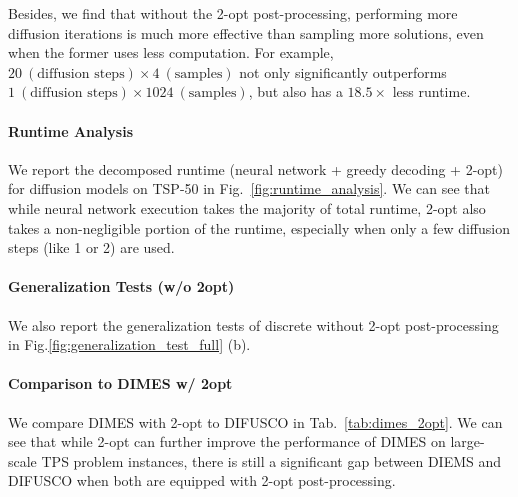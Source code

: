 Besides, we find that without the 2-opt post-processing, performing more diffusion iterations is much more effective than sampling more solutions, even when the former uses less computation. For example, $20\ (\text{diffusion steps}) \times 4 \ (\text{samples})$ not only significantly outperforms $1\ (\text{diffusion steps}) \times 1024\ (\text{samples})$, but also has a $18.5\times$ less runtime.

\paragraph{Runtime Analysis}
We report the decomposed runtime (neural network + greedy decoding + 2-opt) for diffusion models on TSP-50 in Fig.~\ref{fig:runtime_analysis}. We can see that while neural network execution takes the majority of total runtime, 2-opt also takes a non-negligible portion of the runtime, especially when only a few diffusion steps (like 1 or 2) are used.

\paragraph{Generalization Tests (w/o 2opt)}
We also report the generalization tests of discrete \method{} without 2-opt post-processing in Fig.\ref{fig:generalization_test_full} (b).

\paragraph{Comparison to DIMES w/ 2opt}

We compare DIMES with 2-opt to DIFUSCO in Tab.~\ref{tab:dimes_2opt}. We can see that while 2-opt can further improve the performance of DIMES on large-scale TPS problem instances, there is still a significant gap between DIEMS and DIFUSCO when both are equipped with 2-opt post-processing.


